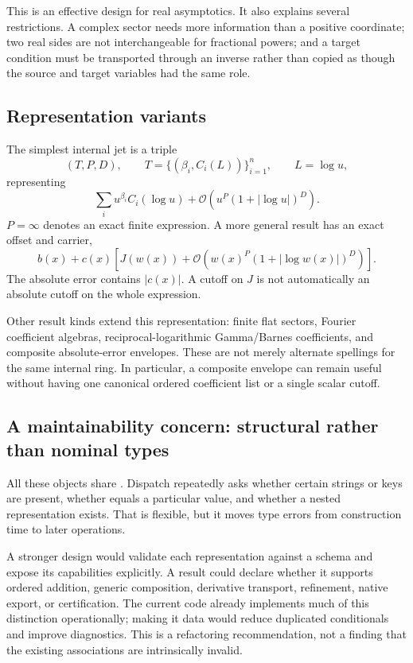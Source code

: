 \documentclass[11pt,a4paper]{article}
\newcommand{\code}[1]{\texttt{\detokenize{#1}}}
\newcommand{\OO}{\mathcal O}
\begin{document}
This is an effective design for real asymptotics. It also explains several restrictions. A complex sector needs more information than a positive coordinate; two real sides are not interchangeable for fractional powers; and a target condition must be transported through an inverse rather than copied as though the source and target variables had the same role.

\subsection{Representation variants}
The simplest internal jet is a triple
\[
 (T,P,D),\qquad T=\{(\beta_i,C_i(L))\}_{i=1}^n,
 \qquad L=\log u,
\]
representing
\begin{equation}\label{eq:jet}
 \sum_i u^{\beta_i}C_i(\log u)
 +\OO\!\left(u^P(1+|\log u|)^D\right).
\end{equation}
$P=\infty$ denotes an exact finite expression. A more general result has an exact offset and carrier,
\begin{equation}\label{eq:carrier}
 b(x)+c(x)\left[J(w(x))+\OO\!\left(w(x)^P(1+|\log w(x)|)^D\right)\right].
\end{equation}
The absolute error contains $|c(x)|$. A cutoff on $J$ is not automatically an absolute cutoff on the whole expression.\cite{operations,calculus}

Other result kinds extend this representation: finite flat sectors, Fourier coefficient algebras, reciprocal-logarithmic Gamma/Barnes coefficients, and composite absolute-error envelopes. These are not merely alternate spellings for the same internal ring. In particular, a composite envelope can remain useful without having one canonical ordered coefficient list or a single scalar cutoff.\cite{guide,arithmetic,native,calculus}

\subsection{A maintainability concern: structural rather than nominal types}
All these objects share \code{GeneralizedSeries[association]}. Dispatch repeatedly asks whether certain strings or keys are present, whether \code{"Kind"} equals a particular value, and whether a nested representation exists. That is flexible, but it moves type errors from construction time to later operations.

A stronger design would validate each representation against a schema and expose its capabilities explicitly. A result could declare whether it supports ordered addition, generic composition, derivative transport, refinement, native export, or certification. The current code already implements much of this distinction operationally; making it data would reduce duplicated conditionals and improve diagnostics. This is a refactoring recommendation, not a finding that the existing associations are intrinsically invalid.
\end{document}
